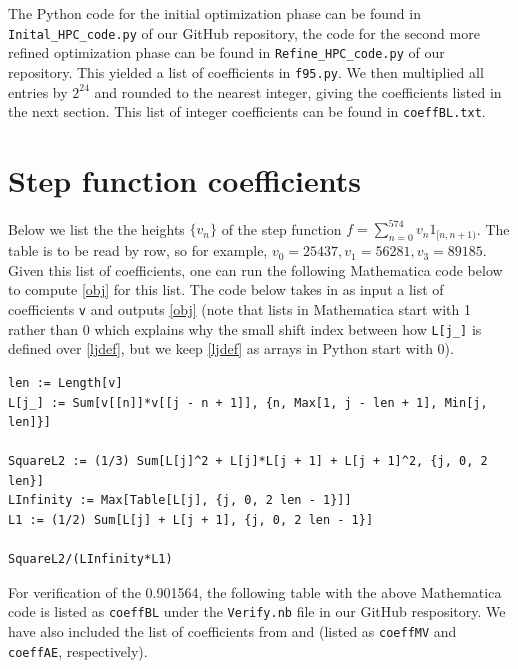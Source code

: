 \documentclass[reqno, 11pt]{amsart}
\theoremstyle{remark}
\begin{document}
The Python code for the initial optimization phase can
be found in \texttt{Inital\_HPC\_code.py} of our GitHub repository,
the code for the second more refined optimization phase can be found
in \texttt{Refine\_HPC\_code.py} of our repository. 
This yielded a list of coefficients in \texttt{f95.py}.
We then multiplied all entries by $2^{24}$ and rounded to the nearest integer,
giving the coefficients listed in the next section. This list of integer
coefficients can be found in \texttt{coeffBL.txt}.

\appendix \section{Step function coefficients}\label{coeff}
Below we list the the heights $\{v_n\}$ of the step function $f = \sum_{n = 0}^{574}v_n 1_{[n, n + 1)}$.
The table is to be read by row, so for example, $v_0 = 25437, v_1 = 56281, v_3 = 89185$.
Given this list of coefficients, one can run
the following Mathematica code below to compute \eqref{obj} for this list. The code below takes in as input a list of coefficients \texttt{v} and outputs \eqref{obj} (note that
lists in Mathematica start with 1 rather than 0 which explains why the small
shift index between how \texttt{L[j\_]} is defined over \eqref{ljdef}, but we keep \eqref{ljdef} as arrays in Python start with 0).\\

\small
\begin{verbatim}
len := Length[v]
L[j_] := Sum[v[[n]]*v[[j - n + 1]], {n, Max[1, j - len + 1], Min[j, len]}]

SquareL2 := (1/3) Sum[L[j]^2 + L[j]*L[j + 1] + L[j + 1]^2, {j, 0, 2 len}]
LInfinity := Max[Table[L[j], {j, 0, 2 len - 1}]]
L1 := (1/2) Sum[L[j] + L[j + 1], {j, 0, 2 len - 1}]

SquareL2/(LInfinity*L1)
\end{verbatim}
\normalsize

For verification of the 0.901564, the following table with the above Mathematica code is listed as \texttt{coeffBL} under the \texttt{Verify.nb} file in our GitHub respository.
We have also included the list of coefficients from \cite{MatolcsiVinuesa} and \cite{AlphaEvolve} (listed as \texttt{coeffMV} and \texttt{coeffAE}, respectively).
\end{document}
